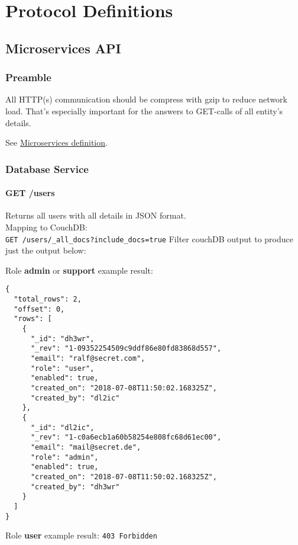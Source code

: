 \chapter{Protocol Definitions}

\section{Microservices API}
\label{protocoldef:microservicesapi}

\subsection{Preamble}
All HTTP(s) communication should be compress with gzip to reduce network load. That's especially important for the answers to GET-calls of all entity's details.

See \hyperref[internalprog:microservices]{Microservices definition}.

\subsection{Database Service}
\subsubsection{GET /users}
\label{protocoldef:microservicesapi:database:getusers}
Returns all users with all details in JSON format.\\

Mapping to CouchDB:\\
\verb|GET /users/_all_docs?include_docs=true|
Filter couchDB output to produce just the output below:

Role \textbf{admin} or \textbf{support} example result:
\begin{lstlisting}
{
  "total_rows": 2,
  "offset": 0,
  "rows": [
    {
      "_id": "dh3wr",
      "_rev": "1-09352254509c9ddf86e80fd83868d557",
      "email": "ralf@secret.com",
      "role": "user",
      "enabled": true,
      "created_on": "2018-07-08T11:50:02.168325Z",
      "created_by": "dl2ic"
    },
    {
      "_id": "dl2ic",
      "_rev": "1-c0a6ecb1a60b58254e808fc68d61ec00",
      "email": "mail@secret.de",
      "role": "admin",
      "enabled": true,
      "created_on": "2018-07-08T11:50:02.168325Z",
      "created_by": "dh3wr"
    }
  ]
}
\end{lstlisting}

Role \textbf{user} example result: \verb|403 Forbidden|



